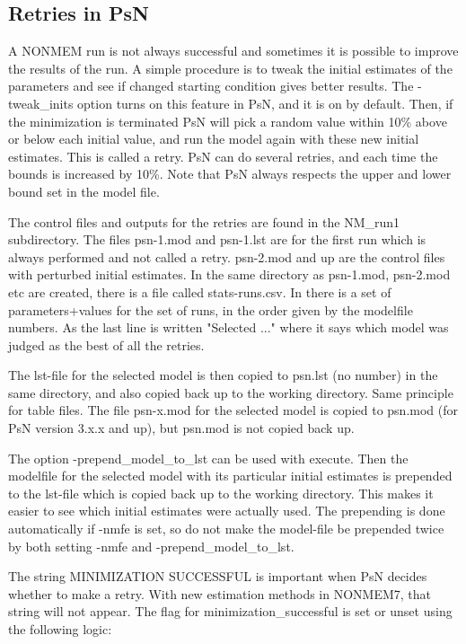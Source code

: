 \subsection{Retries in PsN}

A NONMEM run is not always successful and sometimes it is possible to improve the results of the run. A simple procedure is to tweak the initial estimates of the parameters and see if changed starting condition gives better results. The -tweak\_inits option turns on this feature in PsN, and it is on by default. Then, if the minimization is terminated PsN will pick a random value within 10\% above or below each initial value, and run the model again with these new initial estimates. This is called a retry. PsN can do several retries, and each time the bounds is increased by 10\%. Note that PsN always respects the upper and lower bound set in the model file. 

The control files and outputs for the retries are found in the NM\_run1 subdirectory. The files psn-1.mod and psn-1.lst are for the first run which is always performed and not called a retry. psn-2.mod and up are the control files with perturbed initial estimates. In the same directory as psn-1.mod, psn-2.mod etc are created, there is a file called stats-runs.csv. In there is a set of parameters+values for the set of runs, in the order given by the modelfile numbers. As the last line is written "Selected ..." where it says which model was judged as the best of all the retries.

The lst-file for the selected model is then copied to psn.lst (no number) in the same directory, and also copied back up to the working directory. Same principle for table files. The file psn-x.mod for the selected model is copied to psn.mod (for PsN version 3.x.x and up), but psn.mod is not copied back up.   	

The option -prepend\_model\_to\_lst can be used with execute. Then the modelfile for the selected model with its particular initial estimates is prepended to the lst-file which is copied back up to the working directory. This makes it easier to see which initial estimates were actually used. The prepending is done automatically if -nmfe is set, so do not make the model-file be prepended twice by both setting -nmfe and -prepend\_model\_to\_lst.

The string MINIMIZATION SUCCESSFUL is important when PsN decides whether to make a retry. With new estimation methods in NONMEM7, that string will not appear. The flag for minimization\_successful is set or unset using the following logic:

